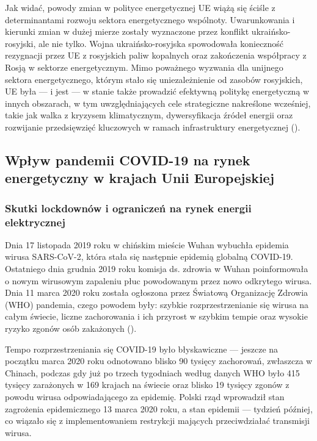 \documentclass[polish, twoside, 12pt, a4paper]{article}
\theoremstyle{definition}
\theoremstyle{plain}
\theoremstyle{remark}
\begin{document}
Jak widać, powody zmian w polityce energetycznej UE wiążą się ściśle z determinantami rozwoju sektora energetycznego wspólnoty. Uwarunkowania i kierunki zmian w dużej mierze zostały wyznaczone przez konflikt ukraińsko-rosyjski, ale nie tylko. Wojna ukraińsko-rosyjska spowodowała konieczność rezygnacji przez UE z rosyjskich paliw kopalnych oraz zakończenia współpracy z Rosją w sektorze energetycznym. Mimo poważnego wyzwania dla unijnego sektora energetycznego, którym stało się uniezależnienie od zasobów rosyjskich, UE była --- i jest --- w stanie także prowadzić efektywną politykę energetyczną w innych obszarach, w tym uwzględniających cele strategiczne nakreślone wcześniej, takie jak walka z kryzysem klimatycznym, dywersyfikacja źródeł energii oraz rozwijanie przedsięwzięć kluczowych w ramach infrastruktury energetycznej (\cite{ep2023}). 



\subsection{Wpływ pandemii COVID-19 na rynek energetyczny w krajach Unii Europejskiej}
\subsubsection{Skutki lockdownów i ograniczeń na rynek energii elektrycznej}

Dnia 17 listopada 2019 roku w chińskim mieście Wuhan wybuchła epidemia wirusa SARS-CoV-2, która stała się następnie epidemią globalną COVID-19. Ostatniego dnia grudnia 2019 roku komisja ds. zdrowia w Wuhan poinformowała o nowym wirusowym zapaleniu płuc powodowanym przez nowo odkrytego wirusa. Dnia 11  marca  2020  roku  została  ogłoszona przez Światową Organizację Zdrowia (WHO) pandemia, czego powodem były: szybkie rozprzestrzenianie się wirusa na całym świecie, liczne zachorowania i ich przyrost w szybkim tempie oraz wysokie ryzyko zgonów osób zakażonych (\cite{gorska2023}).

Tempo rozprzestrzeniania się COVID-19 było błyskawiczne --- jeszcze na początku marca 2020 roku odnotowano blisko 90 tysięcy zachorowań, zwłaszcza w Chinach, podczas gdy już po trzech tygodniach według danych WHO było 415 tysięcy zarażonych w 169 krajach na świecie oraz blisko 19 tysięcy zgonów z powodu wirusa odpowiadającego za epidemię. Polski rząd wprowadził stan zagrożenia epidemicznego 13 marca 2020 roku, a stan epidemii --- tydzień później, co wiązało się z implementowaniem restrykcji mających przeciwdziałać transmisji wirusa. %
\end{document}
